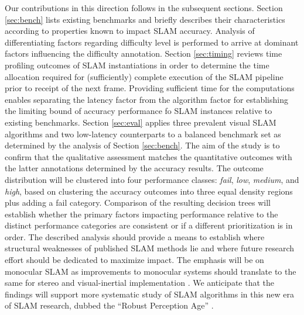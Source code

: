 Our contributions in this direction follows in the subsequent sections.
Section \ref{sec:bench} lists existing benchmarks and briefly describes their
characteristics according to properties known to impact SLAM accuracy.
Analysis of differentiating factors regarding difficulty level is performed
to arrive at dominant factors influencing the difficulty annotation.
Section \ref{sec:timing} reviews time profiling outcomes of SLAM
instantiations in order to determine the time allocation required for
(sufficiently) complete execution of the SLAM pipeline prior to receipt of the 
next frame.  Providing sufficient time for the computations enables
separating the latency factor from the algorithm factor for establishing the
limiting bound of accuracy performance fo SLAM instances relative to existing
benchmarks.
Section \ref{sec:eval} applies 
three prevalent visual SLAM
algorithms and two low-latency counterparts
to a 
balanced
benchmark set as determined by the analysis of Section \ref{sec:bench}. The aim
of the study is to confirm that the qualitative assessment matches the
quantitative outcomes with the latter annotations determined by the
accuracy results.
The outcome distribution will be clustered into four performance classes:
\textit{fail}, \textit{low}, \textit{medium}, and \textit{high}, based on 
clustering the accuracy outcomes into three equal density regions plus
adding a fail category.  Comparison of the resulting decision trees will
establish whether the primary factors impacting performance relative to the
distinct performance categories are consistent or if a different
prioritization is in order.
The described analysis should provide a means to establish where structural
weaknesses of published SLAM methods lie and where future research effort
should be dedicated to maximize impact. %
The emphasis will be on monocular SLAM as improvements to monocular systems
should translate to the same for stereo and visual-inertial implementation
\cite{zhao2019closednav,zhao2019tro}.
We anticipate that the findings will support more systematic study of SLAM
algorithms in this new era of SLAM research, dubbed the ``Robust
Perception Age'' \cite{cadena2016past}.






